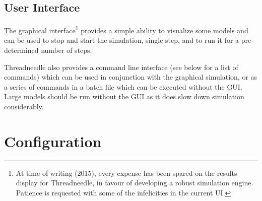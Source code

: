 \documentclass[10pt,oneside,openright, a4paper]{memoir}
\begin{document}
\section{User Interface}
The graphical interface\footnote{At time of writing (2015), every expense 
has been spared on the results display for Threadneedle, in favour of developing
a robust simulation engine. Patience is requested with some
of the infelicities in the current UI.} provides a simple ability to visualize 
some models and can be used to stop and start the
simulation, single step, and to run it for a pre-determined number
of steps. 
\par
Threadneedle also provides a command line interface (see below
for a list of commands)
which can be used in conjunction with the graphical simulation,
or as a series of commands in a batch file which can be
executed without the GUI. Large models should be run without the
GUI as it does slow down simulation considerably.
\newpage
\chapter{Configuration}
\end{document}
